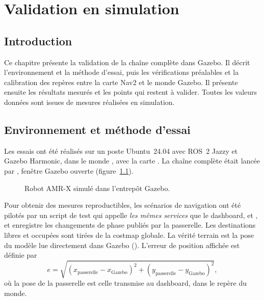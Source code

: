 \chapter{Validation en simulation}
\label{chap:validation}

\section*{Introduction}
Ce chapitre présente la validation de la chaîne complète dans Gazebo. Il décrit
l'environnement et la méthode d'essai, puis les vérifications préalables et la
calibration des repères entre la carte Nav2 et le monde Gazebo. Il présente ensuite les
résultats mesurés et les points qui restent à valider. Toutes les valeurs données sont
issues de mesures réalisées en simulation.

\section{Environnement et méthode d'essai}
Les essais ont été réalisés sur un poste Ubuntu~24.04 avec ROS~2 Jazzy et Gazebo Harmonic,
dans le monde , avec la carte .
La chaîne complète était lancée par , fenêtre Gazebo ouverte
(figure~\ref{fig:gazebo}).

\begin{figure}[htbp]
\centering
{}
\caption{Robot AMR-X simulé dans l'entrepôt Gazebo.}
\label{fig:gazebo}
\end{figure}

Pour obtenir des mesures reproductibles, les scénarios de navigation ont été pilotés par
un script de test qui appelle \emph{les mêmes services} que le dashboard,
 et , et enregistre
les changements de phase publiés par la passerelle. Les destinations libres et occupées
sont tirées de la costmap globale. La vérité terrain est la pose du modèle
 lue directement dans Gazebo (). L'erreur de
position affichée est définie par
\begin{equation}
  e = \sqrt{(x_{\text{passerelle}} - x_{\text{Gazebo}})^2 + (y_{\text{passerelle}} - y_{\text{Gazebo}})^2},
\end{equation}
où la pose de la passerelle est celle transmise au dashboard, dans le repère du monde.

